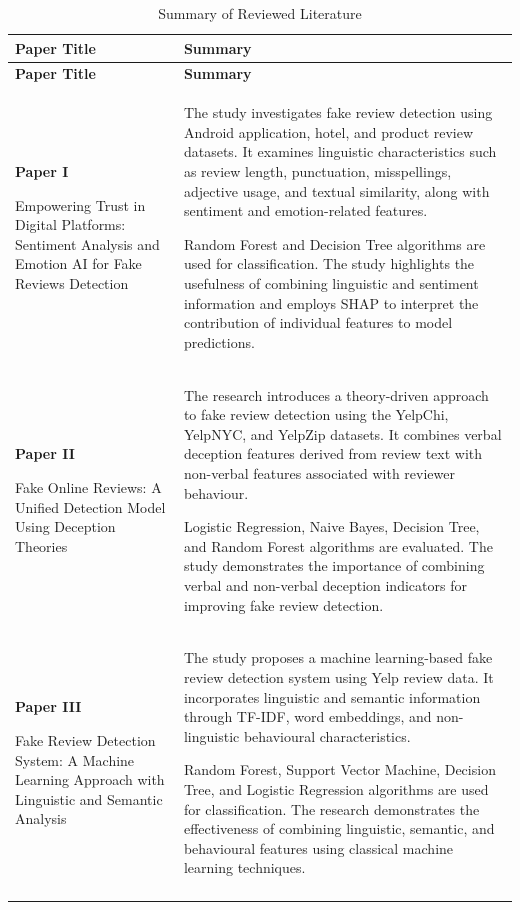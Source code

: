\documentclass[12pt,a4paper]{report}
\begin{document}
\begin{longtable}{|
>{\raggedright\arraybackslash}p{}|
>{\raggedright\arraybackslash}p{}|}
\hline

\textbf{Paper Title} &
\textbf{Summary} \\
\hline
\endfirsthead

\hline
\textbf{Paper Title} &
\textbf{Summary} \\
\hline
\endhead

\textbf{Paper I}

Empowering Trust in Digital Platforms:
Sentiment Analysis and Emotion AI for
Fake Reviews Detection
&
The study investigates fake review detection using
Android application, hotel, and product review datasets.
It examines linguistic characteristics such as review
length, punctuation, misspellings, adjective usage,
and textual similarity, along with sentiment and
emotion-related features.

Random Forest and Decision Tree algorithms are used
for classification. The study highlights the usefulness
of combining linguistic and sentiment information
and employs SHAP to interpret the contribution of
individual features to model predictions.
\\
\hline

\textbf{Paper II}

Fake Online Reviews: A Unified Detection
Model Using Deception Theories
&
The research introduces a theory-driven approach
to fake review detection using the YelpChi,
YelpNYC, and YelpZip datasets. It combines
verbal deception features derived from review
text with non-verbal features associated with
reviewer behaviour.

Logistic Regression, Naive Bayes, Decision Tree,
and Random Forest algorithms are evaluated.
The study demonstrates the importance of
combining verbal and non-verbal deception
indicators for improving fake review detection.
\\
\hline

\textbf{Paper III}

Fake Review Detection System:
A Machine Learning Approach with
Linguistic and Semantic Analysis
&
The study proposes a machine learning-based
fake review detection system using Yelp
review data. It incorporates linguistic and
semantic information through TF-IDF,
word embeddings, and non-linguistic
behavioural characteristics.

Random Forest, Support Vector Machine,
Decision Tree, and Logistic Regression
algorithms are used for classification.
The research demonstrates the effectiveness
of combining linguistic, semantic, and
behavioural features using classical
machine learning techniques.
\\
\hline

\caption{Summary of Reviewed Literature}
\label{tab:litsummary}\\
\end{longtable}
\end{document}

